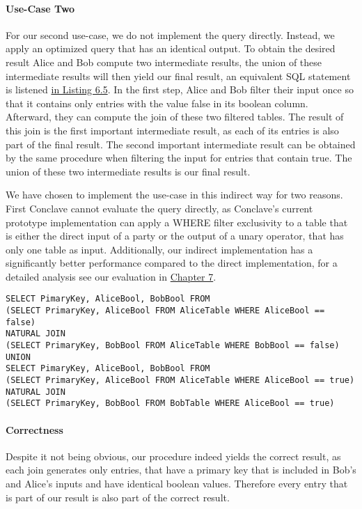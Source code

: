 \paragraph{Use-Case Two}
For our second use-case, we do not implement the query directly. Instead, we apply an optimized query that has an identical output. To obtain the desired result Alice and Bob compute two intermediate results, the union of these intermediate results will then yield our final result, an equivalent SQL statement is listened \hyperref[use_case2_alternative_sql]{ in Listing 6.5}.
In the first step, Alice and Bob filter their input once so that it contains only entries with the value false in its boolean column. Afterward, they can compute the join of these two filtered tables. The result of this join is the first important intermediate result, as each of its entries is also part of the final result. The second important intermediate result can be obtained by the same procedure when filtering the input for entries that contain true.
The union of these two intermediate results is our final result. 

We have chosen to implement the use-case in this indirect way for two reasons. First Conclave cannot evaluate the query directly, as Conclave's current prototype implementation can apply a WHERE filter exclusivity to a table that is either the direct input of a party or the output of a unary operator, that has only one table as input. Additionally, our indirect implementation has a significantly better performance compared to the direct implementation, for a detailed analysis see our evaluation in \hyperref[evaluation]{Chapter 7}.   


\label{use_case2_alternative_sql}
\begin{lstlisting}[caption={Functional equivalent SQL statement for our optimitized implementation of our second use-case}]
SELECT PimaryKey, AliceBool, BobBool FROM
(SELECT PrimaryKey, AliceBool FROM AliceTable WHERE AliceBool == false) 
NATURAL JOIN	
(SELECT PrimaryKey, BobBool FROM AliceTable WHERE BobBool == false)	
UNION
SELECT PimaryKey, AliceBool, BobBool FROM
(SELECT PrimaryKey, AliceBool FROM AliceTable WHERE AliceBool == true) 
NATURAL JOIN	
(SELECT PrimaryKey, BobBool FROM BobTable WHERE AliceBool == true)
\end{lstlisting}

\paragraph{Correctness}
Despite it not being obvious, our procedure indeed yields the correct result, as each join generates only entries, that have a primary key that is included in Bob's and Alice's inputs and have identical boolean values. Therefore every entry that is part of our result is also part of the correct result.

